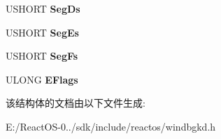 \begin{DoxyCompactItemize}
\item 
\mbox{\label{struct___x86___d_b_g_k_d___c_o_n_t_r_o_l___r_e_p_o_r_t_aaa78c8e2996698827e9c91f15f08fda0}} 
U\+S\+H\+O\+RT {\bfseries Seg\+Ds}
\item 
\mbox{\label{struct___x86___d_b_g_k_d___c_o_n_t_r_o_l___r_e_p_o_r_t_afbb2f86935e7fb046373a0602037de9c}} 
U\+S\+H\+O\+RT {\bfseries Seg\+Es}
\item 
\mbox{\label{struct___x86___d_b_g_k_d___c_o_n_t_r_o_l___r_e_p_o_r_t_a2528df92a171ac761058a6ad44cab9fb}} 
U\+S\+H\+O\+RT {\bfseries Seg\+Fs}
\item 
\mbox{\label{struct___x86___d_b_g_k_d___c_o_n_t_r_o_l___r_e_p_o_r_t_a934f429d7c2d1d89be207888707bb053}} 
U\+L\+O\+NG {\bfseries E\+Flags}
\end{DoxyCompactItemize}


该结构体的文档由以下文件生成\+:\begin{DoxyCompactItemize}
\item 
E\+:/\+React\+O\+S-\/0../sdk/include/reactos/windbgkd.\+h\end{DoxyCompactItemize}
